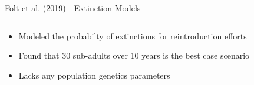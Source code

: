 \documentclass[10pt,aspectratio=169]{beamer}
\begin{document}
\begin{frame}{Folt et al. (2019) - Extinction Models}
\begin{columns}
    \begin{column}[c]{5cm}
        \begin{itemize}
            \item Modeled the probabilty of extinctions for reintroduction efforts
            \item Found that 30 sub-adults over 10 years is the best case scenario
            \item Lacks any population genetics parameters
        \end{itemize}
    \end{column}

\end{columns}
\end{frame}
\end{document}
